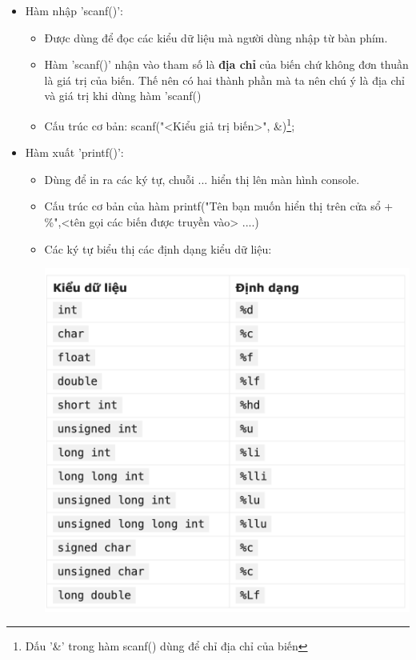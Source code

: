 \documentclass[12pt,a4paper]{article}
\begin{document}
\begin{itemize}
	\item Hàm nhập 'scanf()':
	 \begin{itemize}
            \item Được dùng để đọc các kiểu dữ liệu mà người dùng nhập từ bàn phím.             
            \item Hàm 'scanf()' nhận vào tham số là \textbf{địa chỉ} của biến chứ không đơn thuần là giá trị của biến. Thế nên có hai thành phần mà ta nên chú ý là địa chỉ và giá trị khi dùng hàm 'scanf()
            \item Cấu trúc cơ bản: scanf("<Kiểu giả trị biến>", \&<Tên biến>)\footnote{Dấu '\&' trong hàm scanf() dùng để chỉ địa chỉ của biến };
     \end{itemize}
	 \item Hàm xuất 'printf()':
	\begin{itemize}
            \item Dùng để in ra các ký tự, chuỗi ... hiển thị lên màn hình console.
            \item Cấu trúc cơ bản của hàm printf("Tên bạn muốn hiển thị trên cửa sổ + \%<kiểu dự liệu bạn muốn trích ra từ biến>",<tên gọi các biến được truyền vào> ....)
            \item Các ký tự biểu thị các định dạng kiểu dữ liệu:\\ 
           	\begin{center}
           	\includegraphics[scale = 0.6]{kieudulieu}	
           	\end{center}
     \end{itemize}
\end{itemize}
\end{document}
